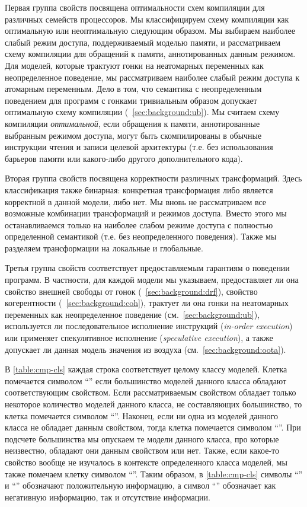 Первая группа свойств посвящена оптимальности схем компиляции 
для различных семейств процессоров. 
Мы классифицируем схему компиляции как оптимальную 
или неоптимальную следующим образом. 
Мы выбираем наиболее слабый режим доступа, 
поддерживаемый моделью памяти, и рассматриваем 
схему компиляции для обращений к памяти, аннотированных данным режимом. 
Для моделей, которые трактуют гонки на неатомарных переменных 
как неопределенное поведение, 
мы рассматриваем наиболее слабый режим доступа к атомарным переменным. 
Дело в том, что семантика с неопределенным поведением 
для программ с гонками тривиальным образом допускает 
оптимальную схему компиляции (\see~\cref{sec:background:ub}).
Мы считаем схему компиляции \emph{оптимальной}, 
если обращения к памяти, аннотированные выбранным режимом доступа, 
могут быть скомпилированы в обычные инструкции чтения 
и записи целевой архитектуры 
(т.е. без использования барьеров памяти или какого-либо другого дополнительного кода).

Вторая группа свойств посвящена корректности различных трансформаций. 
Здесь классификация также бинарная: конкретная трансформация 
либо является корректной в данной модели, либо нет. 
Мы вновь не рассматриваем все возможные комбинации 
трансформаций и режимов доступа. 
Вместо этого мы останавливаемся только на наиболее слабом режиме доступа с  полностью определенной семантикой (т.е. без неопределенного поведения).
Также  мы разделяем трансформации на локальные и глобальные. 

Третья группа свойств соответствует предоставляемым гарантиям
о поведении программ. В частности, для каждой модели
мы указываем, предоставляет ли она свойство 
внешней свободы от гонок \eDRF (\see~\cref{sec:background:drf}),
свойство когерентности (\see~\cref{sec:background:coh}),
 трактует ли она гонки на неатомарных переменных как неопределенное поведение (см.~\cref{sec:background:ub}),
используется ли последовательное исполнение инструкций (\emph{in-order execution}) 
или применяет спекулятивное исполнение (\emph{speculative execution}),
а также допускает ли данная модель значения из воздуха (см.~\cref{sec:background:oota}).

В \cref{table:cmp-cls} каждая строка соответствует целому классу моделей. 
Клетка помечается символом ``\cmark\xspace'' если большинство моделей 
данного класса обладают соответствующим свойством. 
Если рассматриваемым свойством обладает только некоторое количество моделей данного класса, 
не составляющих большинство, то клетка помечается символом ``\wmark\xspace''.
Наконец, если ни одна из моделей данного класса не обладает данным свойством, 
тогда клетка помечается символом ``\xmark\xspace''.
При подсчете большинства 
мы опускаем те модели данного класса, про которые неизвестно, обладают 
они данным свойством или нет. 
Также, если какое-то свойство вообще не изучалось 
в контексте определенного класса моделей, 
мы также помечаем клетку символом ``\xmark''. 
Таким образом, в \cref{table:cmp-cls} символы ``\cmark\xspace'' и ``\wmark\xspace'' 
обозначают положительную информацию, а символ ``\xmark\xspace'' обозначает 
как негативную информацию, так и отсутствие информации. 

